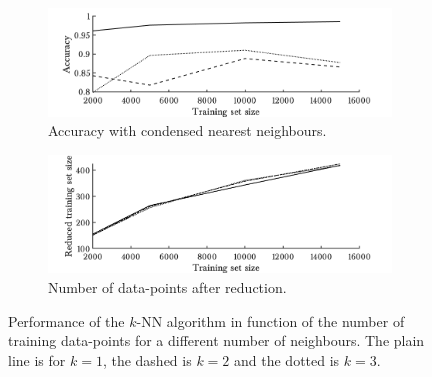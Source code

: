 \begin{figure}[h!]
        \begin{subfigure}[b]{.97\textwidth}  
            \centering 
            \includegraphics[width=.98\textwidth]{parts/chap-4/img-knn/cnn/acc.png}
            \caption{Accuracy with condensed nearest neighbours.}
        \end{subfigure}
        \vfill
        \begin{subfigure}[b]{.97\textwidth}  
            \centering 
            \includegraphics[width=.98\textwidth]{parts/chap-4/img-knn/cnn/red.png}
            \caption{Number of data-points after reduction.} 
        \end{subfigure}
        \caption[Comparison of the CNN results.]{Performance of the $k$-NN algorithm in function of the number of training data-points for a different number of neighbours. The plain line is for $k=1$, the dashed is $k=2$ and the dotted is $k=3$.}
        \label{fig:knn-cnn}
\end{figure}

